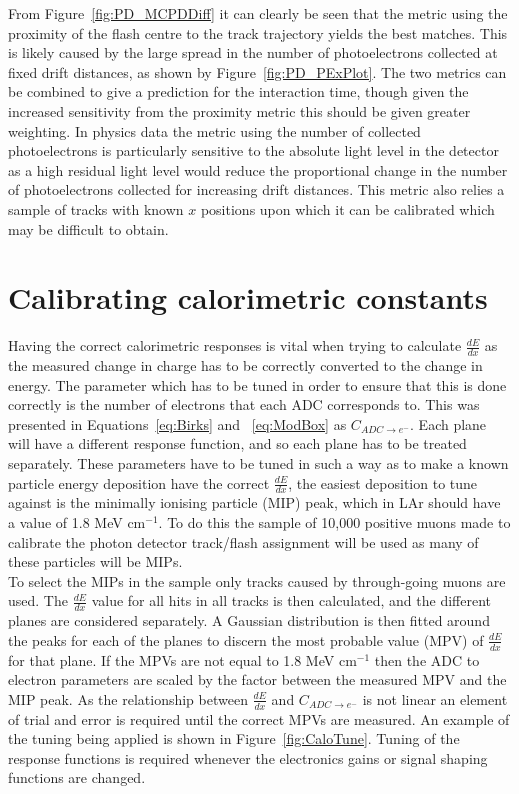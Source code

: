 From Figure~\ref{fig:PD_MCPDDiff} it can clearly be seen that the metric using the proximity of the flash centre to the track trajectory yields the best matches. This is likely caused by the large spread in the number of photoelectrons collected at fixed drift distances, as shown by Figure~\ref{fig:PD_PExPlot}. The two metrics can be combined to give a prediction for the interaction time, though given the increased sensitivity from the proximity metric this should be given greater weighting. In physics data the metric using the number of collected photoelectrons is particularly sensitive to the absolute light level in the detector as a high residual light level would reduce the proportional change in the number of photoelectrons collected for increasing drift distances. This metric also relies a sample of tracks with known $x$ positions upon which it can be calibrated which may be difficult to obtain. \\

\section{Calibrating calorimetric constants} \label{sec:MCCalib} %
Having the correct calorimetric responses is vital when trying to calculate $\frac{dE}{dx}$ as the measured change in charge has to be correctly converted to the change in energy. The parameter which has to be tuned in order to ensure that this is done correctly is the number of electrons that each ADC corresponds to. This was presented in Equations~\ref{eq:Birks} and ~\ref{eq:ModBox} as $C_{ADC \rightarrow e^{-}}$. Each plane will have a different response function, and so each plane has to be treated separately. These parameters have to be tuned in such a way as to make a known particle energy deposition have the correct $\frac{dE}{dx}$, the easiest deposition to tune against is the minimally ionising particle (MIP) peak, which in LAr should have a value of 1.8 MeV cm$^{-1}$. To do this the sample of 10,000 positive muons made to calibrate the photon detector track/flash assignment will be used as many of these particles will be MIPs. \\

To select the MIPs in the sample only tracks caused by through-going muons are used. The $\frac{dE}{dx}$ value for all hits in all tracks is then calculated, and the different planes are considered separately. A Gaussian distribution is then fitted around the peaks for each of the planes to discern the most probable value (MPV) of $\frac{dE}{dx}$ for that plane. If the MPVs are not equal to 1.8 MeV cm$^{-1}$ then the ADC to electron parameters are scaled by the factor between the measured MPV and the MIP peak. As the relationship between $\frac{dE}{dx}$ and $C_{ADC \rightarrow e^{-}}$ is not linear an element of trial and error is required until the correct MPVs are measured. An example of the tuning being applied is shown in Figure~\ref{fig:CaloTune}. Tuning of the response functions is required whenever the electronics gains or signal shaping functions are changed.

